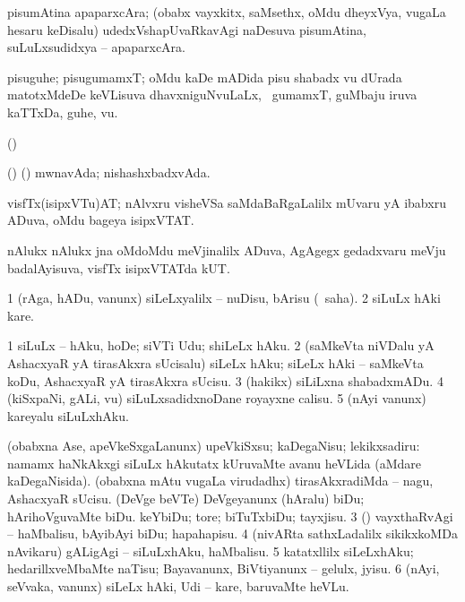 {{{{{{\noindent
\gl{\pagu}
\bmng
{} pisumAtina apaparxcAra; (obabx vayxkitx, saMsethx, oMdu dheyxVya, \mo vugaLa hesaru keDisalu) udedxVshapUvaRkavAgi naDesuva pisumAtina, suLuLxsudidxya -- apaparxcAra. 
\emng
\eentry

\bentry
{}
\gl{\nA}
\bmng
pisuguhe; pisugumamxT; oMdu kaDe mADida pisu shabadx \mo vu dUrada matotxMdeDe keVLisuva dhavxniguNvuLaLx, \sA\ gumamxT, guMbaju iruva kaTTxDa, guhe, \mo vu. 
\emng
\eentry

\bentry
{} 
\gl{\kirx}
\expl{}
\bmng
(\birx)  
\emng
\eentry

\bentry
{} 
\gl{\gu}
\bmng
(\birx) (\pArxparx) mwnavAda; nishashxbadxvAda. 
\emng
\eentry

\bentry
{} 
\gl{\nA}
\expl{}
\bmng
visfTx(isipxVTu)AT; nAlvxru visheVSa saMdaBaRgaLalilx mUvaru yA ibabxru ADuva, oMdu bageya isipxVTAT. 
\emng
\eentry

\bentry
{}
 \gl{\nA}\bmng
nAlukx nAlukx jna oMdoMdu meVjinalilx ADuva, AgAgegx gedadxvaru meVju badalAyisuva, visfTx isipxVTATda kUT. 
\emng
\eentry

\bentry
{} 
\gl{\sakirx}
\expl{}
\bmng
\bnum
\num{1} (rAga, hADu, \mo vanunx) siLeLxyalilx -- nuDisu, bArisu (\akirx\ saha). 
\num{2} siLuLx hAki kare. 
\enum
\emng

\noindent 
\gl{\akirx}
\expl{}
\bmng
\bnum
\num{1} siLuLx -- hAku, hoDe; siVTi Udu; shiLeLx hAku. 
\num{2} (saMkeVta niVDalu yA AshacxyaR yA tirasAkxra sUcisalu) siLeLx hAku; siLeLx hAki -- saMkeVta koDu, AshacxyaR yA tirasAkxra sUcisu. 
\num{3} (hakikx) siLiLxna shabadxmADu. 
\num{4} (kiSxpaNi, gALi, \mo vu) siLuLxsadidxnoDane royayxne calisu. 
\num{5} (nAyi \mo vanunx) kareyalu siLuLxhAku. 
\enum
\emng

\noindent
\gl{\pagu}
\bmng
\bnum
{}  
\banum
{} (obabxna Ase, apeVkeSxgaLanunx) upeVkiSxsu; kaDegaNisu; lekikxsadiru:  namamx haNkAkxgi siLuLx hAkutatx kUruvaMte avanu heVLida (aMdare kaDegaNisida). 
 (obabxna mAtu \mo vugaLa virudadhx) tirasAkxradiMda -- nagu, AshacxyaR sUcisu. 
\eanum
\numie
{}  
\banum
{} (DeVge beVTe) DeVgeyanunx (hAralu) biDu; hArihoVguvaMte biDu. 
 keYbiDu; tore; biTuTxbiDu; tayxjisu. 
\eanum
\numie
\num{3}  (\AmA) vayxthaRvAgi -- haMbalisu, bAyibAyi biDu; hapahapisu. 
\num{4}  (nivARta sathxLadalilx sikikxkoMDa nAvikaru) gALigAgi -- siLuLxhAku, haMbalisu. 
\num{5}  katatxllilx siLeLxhAku; hedarillxveMbaMte naTisu; Bayavanunx, BiVtiyanunx -- gelulx, jyisu. 
\num{6}  (nAyi, seVvaka, \mo vanunx) siLeLx hAki, Udi -- kare, baruvaMte heVLu. 
\enum
\emng
\eentry

}}}}}}
